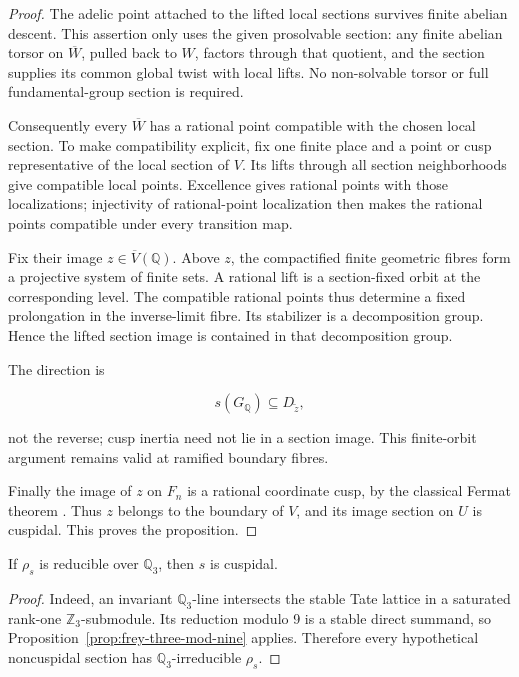 \begin{proof}
The adelic point attached to the lifted local sections survives finite
abelian descent. This assertion only uses the given prosolvable section:
any finite abelian torsor on \(\overline W\), pulled back to \(W\),
factors through that quotient, and the section supplies its common
global twist with local lifts. No non-solvable torsor or full
fundamental-group section is required.

Consequently every \(\overline W\) has a rational point compatible with
the chosen local section. To make compatibility explicit, fix one finite
place and a point or cusp representative of the local section of \(V\).
Its lifts through all section neighborhoods give compatible local
points. Excellence gives rational points with those localizations;
injectivity of rational-point localization then makes the rational
points compatible under every transition map.

Fix their image \(z\in\overline V(\mathbb Q)\). Above \(z\), the
compactified finite geometric fibres form a projective system of finite
sets. A rational lift is a section-fixed orbit at the corresponding
level. The compatible rational points thus determine a fixed
prolongation in the inverse-limit fibre. Its stabilizer is a
decomposition group. Hence the lifted section image is contained in that
decomposition group.

The direction is

\[
s(G_{\mathbb Q})\subseteq D_{\widetilde z},
\]

not the reverse; cusp inertia need not lie in a section image. This
finite-orbit argument remains valid at ramified boundary fibres.

Finally the image of \(z\) on \(F_n\) is a rational coordinate cusp,
by the classical Fermat theorem \citep[Theorem~0.5, p.~448]{Wiles1995}. Thus \(z\) belongs to the boundary of \(V\), and
its image section on \(U\) is cuspidal. This proves the proposition.\end{proof}

\begin{corollary}\label{cor:frey-three-irreducible} If \(\rho_s\) is reducible over \(\mathbb Q_3\),
then \(s\) is cuspidal.

\end{corollary}\begin{proof}
Indeed, an invariant \(\mathbb Q_3\)-line intersects the stable Tate
lattice in a saturated rank-one \(\mathbb Z_3\)-submodule. Its reduction
modulo 9 is a stable direct summand, so Proposition~\ref{prop:frey-three-mod-nine} applies. Therefore
every hypothetical noncuspidal section has \(\mathbb Q_3\)-irreducible
\(\rho_s\).
\end{proof}

